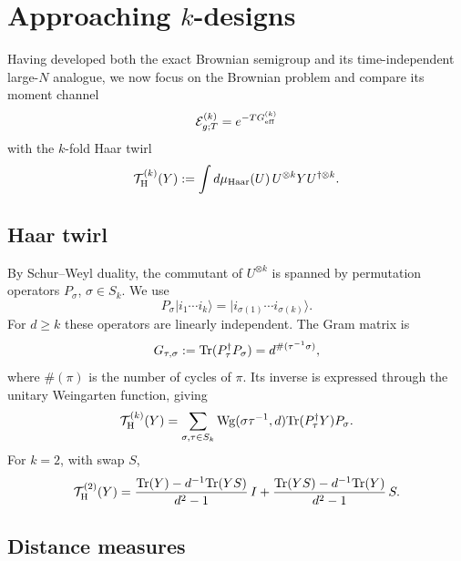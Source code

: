 \documentclass{article}
\theoremstyle{definition}
\begin{document}
\section{Approaching $k$-designs}
\label{sec:kdesigns}

Having developed both the exact Brownian semigroup and its time-independent
large-$N$ analogue, we now focus on the Brownian problem and compare its
moment channel
\begin{equation}
    {\cal E}_{g;T}^{(k)}=e^{-TG_{\rm eff}^{(k)}}
\end{equation}
with the $k$-fold Haar twirl
\begin{equation}
    {\cal T}_{\rm H}^{(k)}(Y)
    :=\int d\mu_{\rm Haar}(U)\,
      U^{\otimes k}YU^{\dagger\otimes k}.
\end{equation}

\subsection{Haar twirl}

By Schur--Weyl duality, the commutant of $U^{\otimes k}$ is spanned by
permutation operators $P_\sigma$, $\sigma\in S_k$.  We use
\begin{equation}
    P_\sigma|i_1\cdots i_k\rangle
    =|i_{\sigma(1)}\cdots i_{\sigma(k)}\rangle.
\end{equation}
For $d\ge k$ these operators are linearly independent.  The Gram matrix is
\begin{equation}
    G_{\tau,\sigma}
    :={\rm Tr}(P_\tau^\dagger P_\sigma)
    =d^{\#(\tau^{-1}\sigma)},
\end{equation}
where $\#(\pi)$ is the number of cycles of $\pi$.  Its inverse is expressed
through the unitary Weingarten function, giving
\begin{equation}
    {\cal T}_{\rm H}^{(k)}(Y)
    =\sum_{\sigma,\tau\in S_k}
      {\rm Wg}(\sigma\tau^{-1},d)
      {\rm Tr}(P_\tau^\dagger Y)P_\sigma.
\end{equation}
For $k=2$, with swap $S$,
\begin{equation}
    {\cal T}_{\rm H}^{(2)}(Y)
    =\frac{{\rm Tr}(Y)-d^{-1}{\rm Tr}(YS)}{d^2-1}\,I
     +\frac{{\rm Tr}(YS)-d^{-1}{\rm Tr}(Y)}{d^2-1}\,S.
\end{equation}

\subsection{Distance measures}
\end{document}
